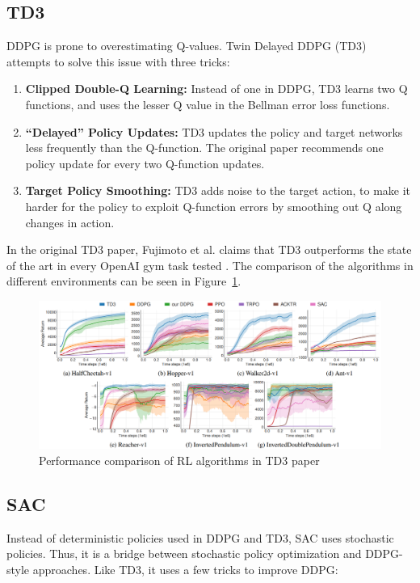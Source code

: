 \documentclass[12pt,twoside]{report}
\begin{document}
\subsection{TD3}
DDPG is prone to overestimating Q-values. Twin Delayed DDPG (TD3) attempts to solve this issue with three tricks: \cite{openai:td3}

\begin{enumerate}
  \item \textbf{Clipped Double-Q Learning:} Instead of one in DDPG, TD3 learns two Q functions, and uses the lesser Q value in the Bellman error loss functions.
  \item \textbf{“Delayed” Policy Updates:} TD3 updates the policy and target networks less frequently than the Q-function. The original paper recommends one policy update for every two Q-function updates.
  \item \textbf{Target Policy Smoothing:} TD3 adds noise to the target action, to make it harder for the policy to exploit Q-function errors by smoothing out Q along changes in action.
\end{enumerate}

In the original TD3 paper, Fujimoto et al. claims that TD3 outperforms the state of the art in every OpenAI gym task tested \cite{td3}. The comparison of the algorithms in different environments can be seen in Figure~\ref{fig:td3-comparisons}.

\begin{figure}[h]
\centering
\includegraphics[width = \hsize]{figures/td3 comparison.png}
\caption{Performance comparison of RL algorithms in TD3 paper \cite{td3}}
\label{fig:td3-comparisons}
\end{figure}


\subsection{SAC}
Instead of deterministic policies used in DDPG and TD3, SAC uses stochastic policies. Thus, it is a bridge between stochastic policy optimization and DDPG-style approaches. Like TD3, it uses a few tricks to improve DDPG: \cite{openai:sac}
\end{document}
